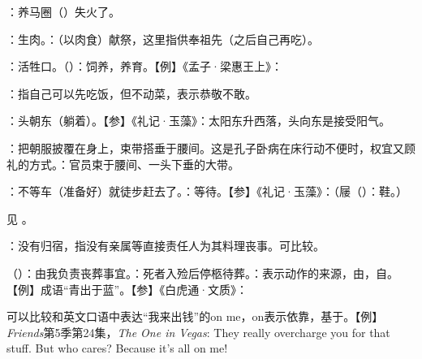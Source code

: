 {
\item {}：养马圈（）失火了。
}
{}


{
\item {}：生肉。：（以肉食）献祭，这里指供奉祖先（之后自己再吃）。
\item {}：活牲口。（）：饲养，养育。【例】《孟子·梁惠王上》：
\item {}：指自己可以先吃饭，但不动菜，表示恭敬不敢。
}
{}


{
\item {}：头朝东（躺着）。【参】《礼记·玉藻》：太阳东升西落，头向东是接受阳气。
\item {}：把朝服披覆在身上，束带搭垂于腰间。这是孔子卧病在床行动不便时，权宜又顾礼的方式。：官员束于腰间、一头下垂的大带。
}
{}


{
\item {}：不等车（准备好）就徒步赶去了。：等待。【参】《礼记·玉藻》：（屦（）：鞋。）
}
{}


{见 。}
{}


{
\item {}：没有归宿，指没有亲属等直接责任人为其料理丧事。可比较。
\item {}（）：由我负责丧葬事宜。：死者入殓后停柩待葬。：表示动作的来源，由，自。【例】成语“青出于蓝”。【参】《白虎通·文质》：

可以比较和英文口语中表达“我来出钱”的on me，on表示依靠，基于。【例】\emph{Friends}第5季第24集，\emph{The One in Vegas}: They really overcharge you for that stuff. But who cares? Because it's all on me!
}
{}


